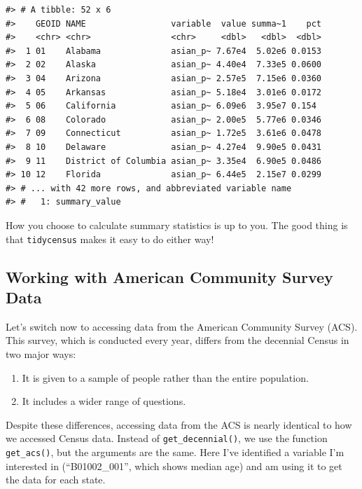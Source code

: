 \documentclass[
]{book}
\providecommand{\tightlist}{%
  \setlength{\itemsep}{0pt}\setlength{\parskip}{0pt}}
\begin{document}
\begin{verbatim}
#> # A tibble: 52 x 6
#>    GEOID NAME                 variable  value summa~1    pct
#>    <chr> <chr>                <chr>     <dbl>   <dbl>  <dbl>
#>  1 01    Alabama              asian_p~ 7.67e4  5.02e6 0.0153
#>  2 02    Alaska               asian_p~ 4.40e4  7.33e5 0.0600
#>  3 04    Arizona              asian_p~ 2.57e5  7.15e6 0.0360
#>  4 05    Arkansas             asian_p~ 5.18e4  3.01e6 0.0172
#>  5 06    California           asian_p~ 6.09e6  3.95e7 0.154 
#>  6 08    Colorado             asian_p~ 2.00e5  5.77e6 0.0346
#>  7 09    Connecticut          asian_p~ 1.72e5  3.61e6 0.0478
#>  8 10    Delaware             asian_p~ 4.27e4  9.90e5 0.0431
#>  9 11    District of Columbia asian_p~ 3.35e4  6.90e5 0.0486
#> 10 12    Florida              asian_p~ 6.44e5  2.15e7 0.0299
#> # ... with 42 more rows, and abbreviated variable name
#> #   1: summary_value
\end{verbatim}

How you choose to calculate summary statistics is up to you. The good thing is that \texttt{tidycensus} makes it easy to do either way!

\hypertarget{working-with-american-community-survey-data}{%
\subsection*{Working with American Community Survey Data}\label{working-with-american-community-survey-data}}

Let's switch now to accessing data from the American Community Survey (ACS). This survey, which is conducted every year, differs from the decennial Census in two major ways:

\begin{enumerate}
\def\labelenumi{\arabic{enumi}.}
\tightlist
\item
  It is given to a sample of people rather than the entire population.
\item
  It includes a wider range of questions.
\end{enumerate}

Despite these differences, accessing data from the ACS is nearly identical to how we accessed Census data. Instead of \texttt{get\_decennial()}, we use the function \texttt{get\_acs()}, but the arguments are the same. Here I've identified a variable I'm interested in (``B01002\_001'', which shows median age) and am using it to get the data for each state.
\end{document}
